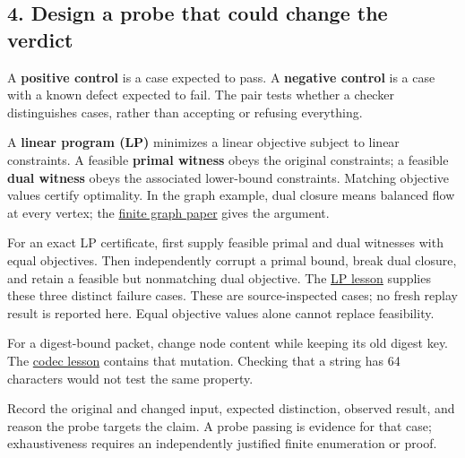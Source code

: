 \documentclass[
  11pt,
]{article}
\begin{document}
\hypertarget{design-a-probe-that-could-change-the-verdict}{%
\subsection{4. Design a probe that could change the
verdict}\label{design-a-probe-that-could-change-the-verdict}}

A \textbf{positive control} is a case expected to pass. A
\textbf{negative control} is a case with a known defect expected to
fail. The pair tests whether a checker distinguishes cases, rather than
accepting or refusing everything.

A \textbf{linear program (LP)} minimizes a linear objective subject to
linear constraints. A feasible \textbf{primal witness} obeys the
original constraints; a feasible \textbf{dual witness} obeys the
associated lower-bound constraints. Matching objective values certify
optimality. In the graph example, dual closure means balanced flow at
every vertex; the
\href{https://github.com/dbccpage/the_symbol_game/blob/593230f7daba7aa04d7c41dd456dfbd00a39bcbd/atlas/coda_atlas/symbol_game/001_pfp_discrete_cochain_retraction_and_toy_involutions/paper.md}{finite
graph paper} gives the argument.

For an exact LP certificate, first supply feasible primal and dual
witnesses with equal objectives. Then independently corrupt a primal
bound, break dual closure, and retain a feasible but nonmatching dual
objective. The
\href{https://github.com/dbccpage/the_symbol_game/blob/52cb5457f6c485ba548cfd292f6012a941ed22cf/education/the_symbol_game/lessons/system_integration/200_intermediates/02_exact_lp_certificates.ipynb}{LP
lesson} supplies these three distinct failure cases. These are
source-inspected cases; no fresh replay result is reported here. Equal
objective values alone cannot replace feasibility.

For a digest-bound packet, change node content while keeping its old
digest key. The
\href{https://github.com/dbccpage/the_symbol_game/blob/52cb5457f6c485ba548cfd292f6012a941ed22cf/education/the_symbol_game/lessons/system_integration/100_novices/01_codecs_and_tamper_evidence.ipynb}{codec
lesson} contains that mutation. Checking that a string has 64 characters
would not test the same property.

Record the original and changed input, expected distinction, observed
result, and reason the probe targets the claim. A probe passing is
evidence for that case; exhaustiveness requires an independently
justified finite enumeration or proof.
\end{document}
